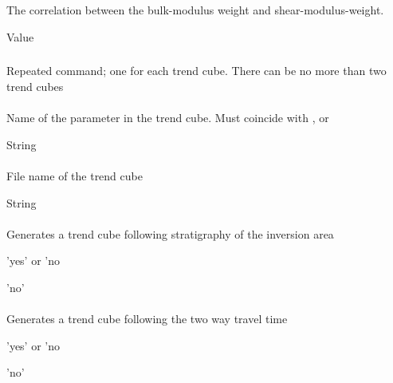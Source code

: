 {\subparagraph{}
 \slist
   \item \Description The correlation between the bulk-modulus weight and shear-modulus-weight.
   \item \Argument Value
   \item {}
 \elist

\subsubsection{}
 \slist
   \item \Description Repeated command; one for each trend cube. There can be no more than two trend cubes
   \item \Argument 
   \item \Default 
 \elist

\paragraph{}
 \slist
   \item \Description Name of the parameter in the trend cube. Must coincide with ,  or 
   \item \Argument String
   \item \Default 
 \elist

\paragraph{}
 \slist
   \item \Description File name of the trend cube 
   \item \Argument String
   \item \Default 
 \elist

\paragraph{}
 \slist
   \item \Description Generates a trend cube following stratigraphy of the inversion area
   \item \Argument 'yes' or 'no
   \item \Default 'no'
 \elist

\paragraph{}
 \slist
   \item \Description Generates a trend cube following the two way travel time
   \item \Argument 'yes' or 'no
   \item \Default 'no'
 \elist

}

